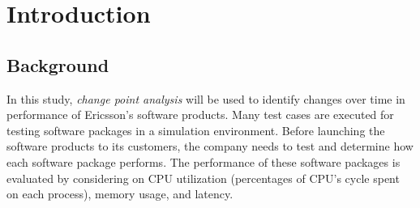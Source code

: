 
\lhead[\chaptername~\thechapter]{\rightmark}

\rhead[\leftmark]{}

\lfoot[\thepage]{}

\cfoot{}

\rfoot[]{\thepage}

\chapter{Introduction}

\section{Background \label{sec:Background}}

In this study, \emph{change point analysis} will be used to identify
changes over time in performance of Ericsson's software products.
Many test cases are executed for testing software packages in a simulation
environment. Before launching the software products to its customers,
the company needs to test and determine how each software package
performs. The performance of these software packages is evaluated
by considering on CPU utilization (percentages of CPU's cycle spent
on each process), memory usage, and latency. 

